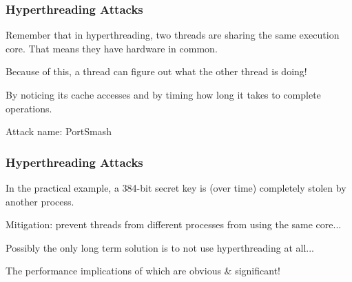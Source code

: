 \begin{frame}
\frametitle{Hyperthreading Attacks}
Remember that in hyperthreading, two threads are sharing the same execution core. That means they have hardware in common. 

Because of this, a thread can figure out what the other thread is doing!

By noticing its cache accesses and by timing how long it takes to complete operations.

Attack name: PortSmash

\end{frame}

\begin{frame}
\frametitle{Hyperthreading Attacks}
In the practical example, a 384-bit secret key is (over time) completely stolen by another process. 

Mitigation: prevent threads from different processes from using the same core... 

Possibly the only long term solution is to not use hyperthreading at all... 

The performance implications of which are obvious \& significant!


\end{frame}


